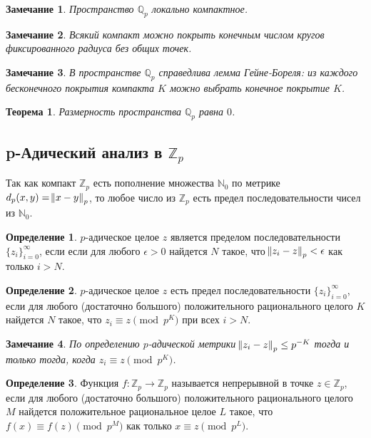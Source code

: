 \documentclass[master, och, diploma, times]{sty/SCWorks}
\theoremstyle{plain}
\newtheorem{thethm}{Теорема}
\newtheorem{note}{Замечание}
\theoremstyle{definition}
\newtheorem{defn}{Определение}[section]
\begin{document}
\begin{note}
Пространство $\mathbb {Q}_p$ локально компактное.
\end{note}

\begin{note}
Всякий компакт можно покрыть конечным числом кругов фиксированного радиуса без общих точек.
\end{note}

\begin{note}
В пространстве $\mathbb {Q}_p$ справедлива лемма Гейне-Бореля: из каждого бесконечного покрытия компакта $K$ можно выбрать конечное покрытие $K$.
\end{note}

\begin{thethm}
Размерность пространства $\mathbb {Q}_p$ равна $0$.
\end{thethm}

\subsection{p-Адический анализ в $\mathbb {Z}_p$}

Так как компакт $\mathbb {Z}_p$ есть пополнение множества $\mathbb {N}_0$ по метрике \linebreak ${d_p(x,y)=\norm{x-y}_p}$, то любое число из $\mathbb {Z}_p$ есть предел последовательности чисел из $\mathbb {N}_0$.

\begin{defn}
$p$-адическое целое $z$ является пределом последовательности $\{z_i\}^{\infty}_{i=0}$, если если для любого $\epsilon > 0$ найдется $N$ такое, что $\norm{z_i-z}_p < \epsilon$ как только $i>N$. \cite{bib:analysis:anashin}
\end{defn}

\begin{defn}
$p$-адическое целое $z$ есть предел последовательности $\{z_i\}^{\infty}_{i=0}$, если для любого (достаточно большого) положительного рационального целого $K$ найдется $N$ такое, что ${z_i \equiv z \pmod p^K}$ при всех $i>N$. \cite{bib:analysis:anashin}
\end{defn}

\begin{note}
По определению $p$-адической метрики $\norm{z_i-z}_p \le p^{-K}$ тогда и только тогда, когда $z_i \equiv z \pmod p^K$. \cite{bib:analysis:anashin}
\end{note}

\begin{defn}
Функция $f:\mathbb {Z}_p \rightarrow \mathbb {Z}_p$ называется непрерывной в точке $z \in \mathbb {Z}_p$, если для любого (достаточно большого) положительного рационального целого $M$ найдется положительное рациональное целое $L$ такое, что ${f(x) \equiv f(z) \pmod p^M}$ как только $x \equiv z \pmod{p^L}$. \cite{bib:analysis:anashin}
\end{defn}
\end{document}
